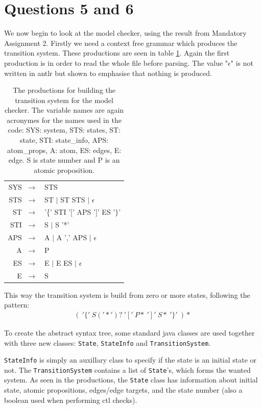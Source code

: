 \section*{Questions 5 and 6}

We now begin to look at the model checker, using the result from Mandatory Assignment 2. Firstly we need a context free grammar which produces the transition system. These productions are seen in table \ref{tab:Q5prod}. Again the first production is in order to read the whole file before parsing. The value "$\epsilon$" is not written in antlr but shown to emphasise that nothing is produced.

\begin{table}[H]
    \centering
    \begin{tabular}{|rl|}
    \hline
    SYS $\;\rightarrow$ & STS \\
    STS  $\;\rightarrow$ & ST $|$ ST STS $|$ $\epsilon$ \\
    ST  $\;\rightarrow$ & '\{' STI '$[$' APS '$]$' ES '$\}$' \\
    STI $\;\rightarrow$ & S $|$ S '*' \\
    APS $\;\rightarrow$ & A $|$ A ',' APS $|$ $\epsilon$ \\
    A $\;\rightarrow$ & P \\
    ES $\;\rightarrow$ & E $|$ E ES $|$ $\epsilon$ \\
    E $\;\rightarrow$ & S \\
    \hline
    \end{tabular}
    \caption{The productions for building the transition system for the model checker. The variable names are again acronymes for the names used in the code: SYS: system, STS: states, ST: state, STI: state\_info, APS: atom\_props, A: atom, ES: edges, E: edge. S is state number and P is an atomic proposition.}
    \label{tab:Q5prod}
\end{table}

This way the transition system is build from zero or more states, following the pattern: 
\begin{gather*}
    ( \: '\{' \: S('*')? \: '[' \: P* \: ']' \: S* \: '\}' \: )*
\end{gather*}

To create the abstract syntax tree, some standard java classes are used together with three new classes: \texttt{State}, \texttt{StateInfo} and \texttt{TransitionSystem}. 

\texttt{StateInfo} is simply an auxillary class to specify if the state is an initial state or not. The \texttt{TransitionSystem} contains a list of \texttt{State}'s, which forms the wanted system. As seen in the productions, the \texttt{State} class has information about initial state, atomic propositions, edges/edge targets, and the state number (also a boolean used when performing ctl checks).

